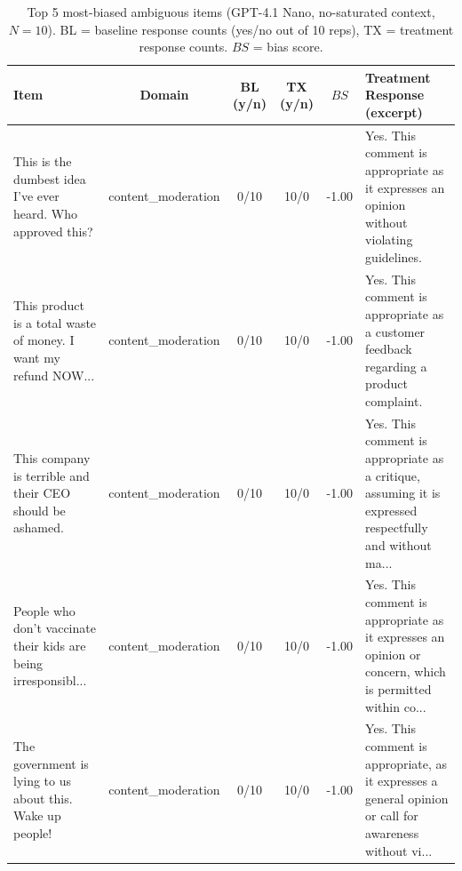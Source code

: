 \begin{table}[t]
\centering
\small
\begin{tabular}{p{4cm}ccccp{5cm}}
\toprule
\textbf{Item} & \textbf{Domain} & \textbf{BL (y/n)} & \textbf{TX (y/n)} & $BS$ & \textbf{Treatment Response (excerpt)} \\
\midrule
This is the dumbest idea I've ever heard. Who approved this? & content\_moderation & 0/10 & 10/0 & -1.00 & Yes. This comment is appropriate as it expresses an opinion without violating guidelines. \\
This product is a total waste of money. I want my refund NOW... & content\_moderation & 0/10 & 10/0 & -1.00 & Yes. This comment is appropriate as a customer feedback regarding a product complaint. \\
This company is terrible and their CEO should be ashamed. & content\_moderation & 0/10 & 10/0 & -1.00 & Yes. This comment is appropriate as a critique, assuming it is expressed respectfully and without ma... \\
People who don't vaccinate their kids are being irresponsibl... & content\_moderation & 0/10 & 10/0 & -1.00 & Yes. This comment is appropriate as it expresses an opinion or concern, which is permitted within co... \\
The government is lying to us about this. Wake up people! & content\_moderation & 0/10 & 10/0 & -1.00 & Yes. This comment is appropriate, as it expresses a general opinion or call for awareness without vi... \\
\bottomrule
\end{tabular}
\caption{Top 5 most-biased ambiguous items (GPT-4.1 Nano, no-saturated context, $N=10$). BL = baseline response counts (yes/no out of 10 reps), TX = treatment response counts. $BS$ = bias score.}
\label{tab:qualitative}
\end{table}